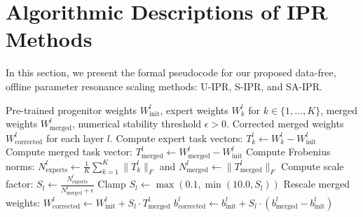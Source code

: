 \documentclass{article}
\begin{document}
\section{Algorithmic Descriptions of IPR Methods}
\label{app:algorithms}

In this section, we present the formal pseudocode for our proposed data-free, offline parameter resonance scaling methods: U-IPR, S-IPR, and SA-IPR.

\begin{algorithm}[H]
\caption{Update-level Isotropic Parameter Resonance (U-IPR)}
\label{alg:u_ipr}
\begin{algorithmic}[1]
\REQUIRE Pre-trained progenitor weights $W_{\text{init}}^l$, expert weights $W_k^l$ for $k \in \{1,\dots,K\}$, merged weights $W_{\text{merged}}^l$, numerical stability threshold $\epsilon > 0$.
\ENSURE Corrected merged weights $W_{\text{corrected}}^l$ for each layer $l$.
    \STATE Compute expert task vectors: $T_k^l \leftarrow W_k^l - W_{\text{init}}^l$
    \STATE Compute merged task vector: $T_{\text{merged}}^l \leftarrow W_{\text{merged}}^l - W_{\text{init}}^l$
    \STATE Compute Frobenius norms: $N_{\text{experts}}^l \leftarrow \frac{1}{K} \sum_{k=1}^K \|T_k^l\|_F$ and $N_{\text{merged}}^l \leftarrow \|T_{\text{merged}}^l\|_F$
    \STATE Compute scale factor: $S_l \leftarrow \frac{N_{\text{experts}}^l}{N_{\text{merged}}^l + \epsilon}$
    \STATE Clamp $S_l \leftarrow \max(0.1, \min(10.0, S_l))$
    \STATE Rescale merged weights: $W_{\text{corrected}}^l \leftarrow W_{\text{init}}^l + S_l \cdot T_{\text{merged}}^l$
        \STATE $b_{\text{corrected}}^l \leftarrow b_{\text{init}}^l + S_l \cdot (b_{\text{merged}}^l - b_{\text{init}}^l)$
    \ENDIF
\ENDFOR
\end{algorithmic}
\end{algorithm}
\end{document}

